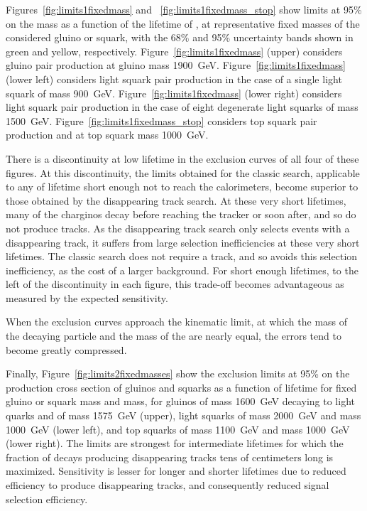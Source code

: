   Figures~\ref{fig:limits1fixedmass} and ~\ref{fig:limits1fixedmass_stop} show limits at 95\% \CL on the \lsp mass as a function of the lifetime of \chargino, at representative fixed masses of the considered gluino or squark, with the 68\% and 95\% uncertainty bands shown in green and yellow, respectively.
  Figure~\ref{fig:limits1fixedmass} (upper) considers gluino pair production at gluino mass 1900~GeV.
  Figure~\ref{fig:limits1fixedmass} (lower left) considers light squark pair production in the case of a single light squark of mass 900~GeV.
  Figure~\ref{fig:limits1fixedmass} (lower right) considers light squark pair production in the case of eight degenerate light squarks of mass 1500~GeV.
  Figure~\ref{fig:limits1fixedmass_stop} considers top squark pair production and at top squark mass 1000~GeV.

  There is a discontinuity at low \chargino lifetime in the exclusion curves of all four of these figures.
  At this discontinuity, the limits obtained for the classic search, applicable to any \chargino of lifetime short enough not to reach the calorimeters, become superior to those obtained by the disappearing track search.
  At these very short lifetimes, many of the charginos decay before reaching the tracker or soon after, and so do not produce tracks.
  As the disappearing track search only selects events with a disappearing track, it suffers from large selection inefficiencies at these very short lifetimes.
  The classic search does not require a track, and so avoids this selection inefficiency, as the cost of a larger background.
  For short enough \chargino lifetimes, to the left of the discontinuity in each figure, this trade-off becomes advantageous as measured by the expected sensitivity.

  When the exclusion curves approach the kinematic limit, at which the mass of the decaying particle and the mass of the \chargino are nearly equal, the errors tend to become greatly compressed.

  Finally, Figure~\ref{fig:limits2fixedmasses} show the exclusion limits at 95\% \CL on the production cross section of gluinos and squarks as a function of \chargino lifetime for fixed gluino or squark mass and \lsp mass, for gluinos of mass 1600~GeV decaying to light quarks and \lsp of mass 1575~GeV (upper), light squarks of mass 2000~GeV and \lsp mass 1000~GeV (lower left), and top squarks of mass 1100~GeV and \lsp mass 1000~GeV (lower right).
  The limits are strongest for intermediate \chargino lifetimes for which the fraction of \chargino decays producing disappearing tracks tens of centimeters long is maximized.
  Sensitivity is lesser for longer and shorter lifetimes due to reduced efficiency to produce disappearing tracks, and consequently reduced signal selection efficiency.

